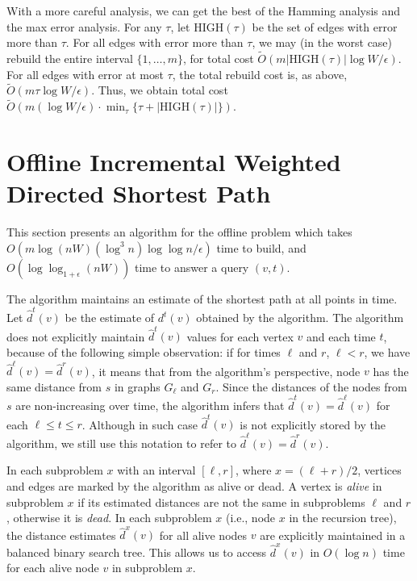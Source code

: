 \documentclass[11pt]{article}
\begin{document}
With a more careful analysis, we can get the best of the Hamming analysis and the max error analysis.  For any $\tau$, let $\text{HIGH}(\tau)$ be the set of edges with error more than $\tau$.  For all edges with error more than $\tau$, we may (in the worst case) rebuild the entire interval $\{1, \ldots, m\}$, for total cost $\tilde{O}(m |\text{HIGH}(\tau)| \log W/\epsilon)$.  For all edges with error at most $\tau$, the total rebuild cost is, as above, $\tilde{O}(m\tau\log W/\epsilon)$.  Thus, we obtain total cost $ \tilde{O}\left(m (\log W/\epsilon) \cdot \min_{\tau} \{ \tau+|\text{HIGH}(\tau)| \}\right)$. \section{Offline Incremental Weighted Directed Shortest Path}
\label{sec:offline}
This section presents an algorithm for the offline problem which takes ${O(m\log (nW) (\log^3 n)\log\log n/\epsilon)}$ time to build, and $O(\log \log_{1+\epsilon}(nW))$ time to answer a query $(v,t)$.  

The algorithm maintains an estimate of the shortest path at all points in time.  
Let $\hat{d}^t(v)$ be the estimate of $d^t(v)$ obtained by the algorithm. 
The algorithm does not explicitly maintain $\hat{d}^t(v)$ values for each vertex $v$ and each time $t$, because of the following simple observation: 
if for times $\ell$ and $r$, $\ell<r$, we have $\hat{d}^\ell(v)=\hat{d}^r(v)$, it means that from the algorithm's perspective, node $v$ has the same distance from $s$ in graphs $G_{\ell}$ and $G_r$. 
Since the distances of the nodes from $s$
are non-increasing over time, the algorithm infers that $\hat{d}^t(v)=\hat{d}^\ell(v)$ for each $\ell \leq t \leq r$.
Although in such case $\hat{d}^t(v)$ is not explicitly stored by the algorithm, we still use this notation to refer to $\hat{d}^{\ell}(v)=\hat{d}^r(v)$.

In each subproblem $x$ with an interval $[\ell,r]$, where $x=(\ell+r)/2$, vertices and edges are marked by the algorithm as alive or dead.
A vertex is \emph{alive} in subproblem $x$ if its estimated distances are not the same in subproblems $\ell$ and $r$, otherwise it is \emph{dead}.
In each subproblem $x$ (i.e., node $x$ in the recursion tree), the distance estimates $\hat{d}^x(v)$ for all alive nodes $v$ are explicitly maintained in a balanced binary search tree.
This allows us to access $\hat{d}^x(v)$ in $O(\log n)$ time for each alive node $v$ in subproblem $x$.
\end{document}
